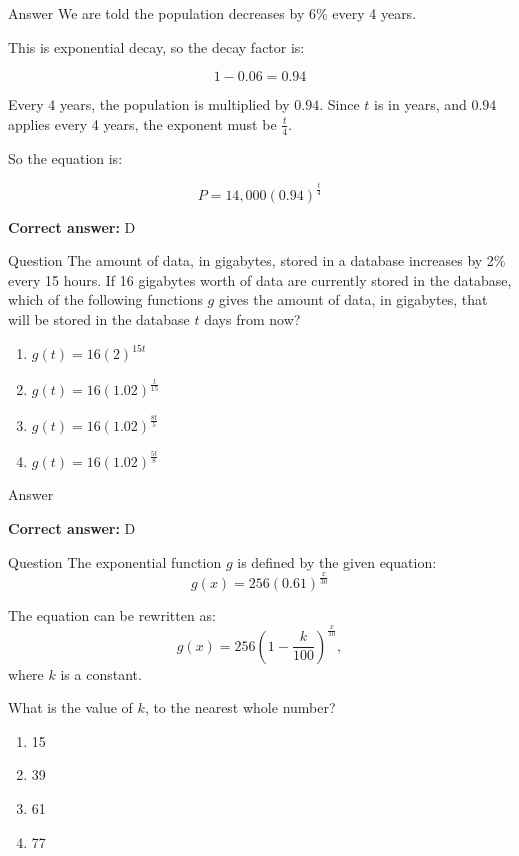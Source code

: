 \documentclass{beamer}
\begin{document}
\begin{frame}{Answer}
We are told the population decreases by 6\% every 4 years.

This is exponential decay, so the decay factor is:

\[
1 - 0.06 = 0.94
\]

Every 4 years, the population is multiplied by $0.94$. Since $t$ is in years, and $0.94$ applies every 4 years, the exponent must be $\frac{t}{4}$.

So the equation is:

\[
P = 14{,}000(0.94)^{\frac{t}{4}}
\]

\textbf{Correct answer:} D
\end{frame}


\begin{frame}{Question}
The amount of data, in gigabytes, stored in a database increases by 2\% every 15 hours. If 16 gigabytes worth of data are currently stored in the database, which of the following functions $g$ gives the amount of data, in gigabytes, that will be stored in the database $t$ days from now?

\begin{enumerate}
  \item[A)] $g(t) = 16(2)^{15t}$
  \item[B)] $g(t) = 16(1.02)^{\frac{t}{15}}$
  \item[C)] $g(t) = 16(1.02)^{\frac{8t}{5}}$
  \item[D)] $g(t) = 16(1.02)^{\frac{5t}{8}}$
\end{enumerate}
\end{frame}


\begin{frame}{Answer}


\textbf{Correct answer:} D
\end{frame}

\begin{frame}{Question}
The exponential function $g$ is defined by the given equation:
\[
g(x) = 256(0.61)^{\frac{x}{30}}
\]

The equation can be rewritten as:
\[
g(x) = 256\left(1 - \frac{k}{100}\right)^{\frac{x}{10}},
\]
where $k$ is a constant.

What is the value of $k$, to the nearest whole number?

\begin{enumerate}
  \item[A)] 15
  \item[B)] 39
  \item[C)] 61
  \item[D)] 77
\end{enumerate}
\end{frame}
\end{document}
